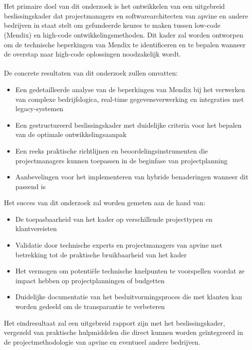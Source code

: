 \section{}%
\label{sec:onderzoeksdoelstelling}
Het primaire doel van dit onderzoek is het ontwikkelen van een uitgebreid beslissingskader dat projectmanagers en softwarearchitecten van apvine en andere bedrijven in staat stelt om gefundeerde keuzes te maken tussen low-code (Mendix) en high-code ontwikkelingsmethoden. Dit kader zal worden ontworpen om de technische beperkingen van Mendix te identificeren en te bepalen wanneer de overstap naar high-code oplossingen noodzakelijk wordt.
\\
\\
De concrete resultaten van dit onderzoek zullen omvatten:
\begin{itemize}
\item Een gedetailleerde analyse van de beperkingen van Mendix bij het verwerken van complexe bedrijfslogica, real-time gegevensverwerking en integraties met legacy-systemen
\item Een gestructureerd beslissingskader met duidelijke criteria voor het bepalen van de optimale ontwikkelingsaanpak
\item Een reeks praktische richtlijnen en beoordelingsinstrumenten die projectmanagers kunnen toepassen in de beginfase van projectplanning
\item Aanbevelingen voor het implementeren van hybride benaderingen wanneer dit passend is
\end{itemize}


Het succes van dit onderzoek zal worden gemeten aan de hand van:
\begin{itemize}
\item De toepasbaarheid van het kader op verschillende projecttypen en klantvereisten
\item Validatie door technische experts en projectmanagers van apvine met betrekking tot de praktische bruikbaarheid van het kader
\item Het vermogen om potentiële technische knelpunten te voorspellen voordat ze impact hebben op projectplanningen of budgetten
\item Duidelijke documentatie van het besluitvormingsproces die met klanten kan worden gedeeld om de transparantie te verbeteren
\end{itemize}


Het eindresultaat zal een uitgebreid rapport zijn met het beslissingskader, vergezeld van praktische hulpmiddelen die direct kunnen worden geïntegreerd in de projectmethodologie van apvine en eventueel andere bedrijven.

